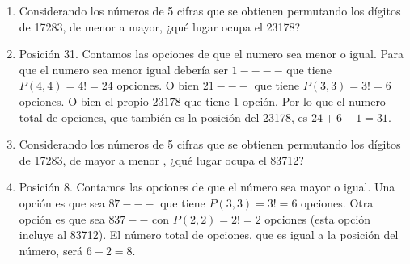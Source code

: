 \documentclass[a4paper]{article}
\newcommand{\answer}{\item[**]}
\begin{document}
\begin{enumerate}
\begin{enumerate} [label=(\alph*)]
		\item Considerando los números de 5 cifras que se obtienen permutando los dígitos de 17283, de menor a mayor, ¿qué lugar ocupa el 23178?
		\answer Posición 31. Contamos las opciones de que el numero sea menor o igual. Para que el numero sea menor igual debería ser $1----$ que tiene $P(4,4)=4!=24$ opciones. O bien $21---$ que tiene $P(3,3)=3!=6$ opciones. O bien el propio $23178$ que tiene $1$ opción. Por lo que el numero total de opciones, que también es la posición del 23178, es $24+6+1=31$.

		\item Considerando los números de 5 cifras que se obtienen permutando los dígitos de 17283, de mayor a menor , ¿qué lugar ocupa el 83712?
		\answer Posición 8. Contamos las opciones de que el número sea mayor o igual. Una opción es que sea $87---$ que tiene $P(3,3)=3!=6$ opciones. Otra opción es que sea $837--$ con $P(2,2)=2!=2$ opciones (esta opción incluye al 83712). El número total de opciones, que es igual a la posición del número, será $6+2=8$.


	\end{enumerate}


\end{enumerate}
\end{document}
